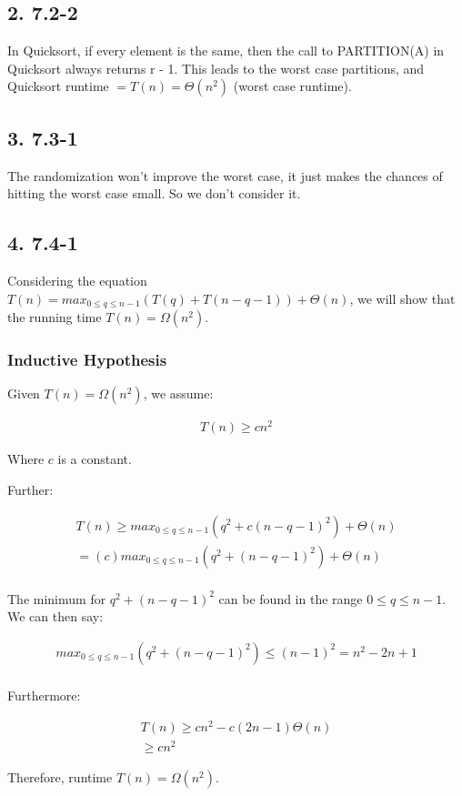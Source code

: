 \documentclass[11pt,letterpaper]{article}
\begin{document}
\subsection*{2. 7.2-2}
In Quicksort, if every element is the same, then the call to PARTITION(A) in Quicksort always returns r - 1. 
This leads to the worst case partitions, and Quicksort runtime $ = T(n) = \Theta(n^2) $ (worst case
runtime).


\subsection*{3. 7.3-1}
The randomization won't improve the worst case, it just makes the chances of hitting the worst case small.
So we don't consider it.


\subsection*{4. 7.4-1}
Considering the equation $ T(n) = max_{0 \le q \le n - 1} ( T(q) + T(n - q - 1)) + \Theta(n) $, we will show
that the running time $ T(n) = \Omega(n^2) $.

\subsubsection*{Inductive Hypothesis}
Given $ T(n) = \Omega(n^2) $, we assume:

\begin{eqnarray}
	T(n) \ge cn^2
\end{eqnarray}

Where $c$ is a constant. 


\pagebreak

Further:

\begin{eqnarray}
	T(n) \ge max_{0 \le q \le n - 1} ( q^2 + c(n - q - 1)^2 ) + \Theta(n) \\
		= (c) max_{0 \le q \le n - 1} ( q^2 + (n - q - 1)^2 ) + \Theta(n) \\
\end{eqnarray}

The minimum for $q^2 + (n - q - 1)^2$ can be found  in the range $ 0 \le q \le n - 1 $. We can then say:

\begin{eqnarray}
	max_{0 \le q \le n - 1} ( q^2 + (n - q - 1)^2 ) \le (n - 1)^2 = n^2 - 2n + 1 \\
\end{eqnarray}

Furthermore:

\begin{eqnarray}
	T(n) 	\ge cn^2 - c(2n - 1) \Theta(n) \\
		\ge cn^2
\end{eqnarray}

Therefore, runtime $ T(n) = \Omega(n^2) $.
\end{document}
